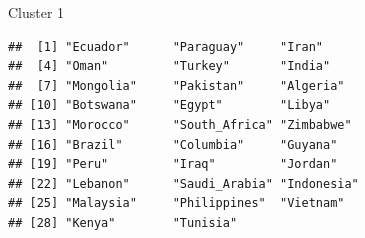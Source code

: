 \begin{frame}[fragile]{Cluster 1}

\begin{knitrout}\footnotesize
{}\color{fgcolor}\begin{kframe}
\begin{alltt}
\hlstd{(vital.s,country[cluster}\hlopt{==}\hlstd{])}
\end{alltt}
\begin{verbatim}
##  [1] "Ecuador"      "Paraguay"     "Iran"        
##  [4] "Oman"         "Turkey"       "India"       
##  [7] "Mongolia"     "Pakistan"     "Algeria"     
## [10] "Botswana"     "Egypt"        "Libya"       
## [13] "Morocco"      "South_Africa" "Zimbabwe"    
## [16] "Brazil"       "Columbia"     "Guyana"      
## [19] "Peru"         "Iraq"         "Jordan"      
## [22] "Lebanon"      "Saudi_Arabia" "Indonesia"   
## [25] "Malaysia"     "Philippines"  "Vietnam"     
## [28] "Kenya"        "Tunisia"
\end{verbatim}
\end{kframe}
\end{knitrout}
\end{frame}

